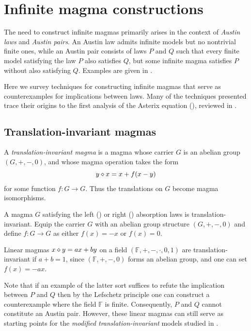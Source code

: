 \chapter{Infinite magma constructions}\label{infinite-magma-constructions-chapter}

The need to construct infinite magmas primarily arises in the context of \emph{Austin laws} and \emph{Austin pairs}.
An Austin law admits infinite models but no nontrivial finite ones, while an Austin pair consists of
laws $P$ and $Q$ such that every finite model satisfying the law $P$ also satisfies $Q$, but some
infinite magma satisfies $P$ without also satisfying $Q$. Examples are given in .

Here we survey techniques for constructing infinite magmas that serve as counterexamples for implications
between laws. Many of the techniques presented trace their origins to the first analysis of the Asterix equation
(), reviewed in .

\section{Translation-invariant magmas}

A \emph{translation-invariant magma} is a magma whose carrier $G$ is an abelian group $(G,+,-,0)$, and whose magma operation takes the form
$$ y \diamond x = x + f(x-y)$$
for some function $f: G \to G$.  Thus the translations on $G$ become magma isomorphisms.

\begin{example}
  A magma $G$ satisfying the left () or right () absorption laws is translation-invariant.
  Equip the carrier $G$ with an abelian group structure $(G,+,-,0)$ and define $f: G \to G$ as either $f(x) = -x$ or $f(x) = 0$.
\end{example}

\begin{example}
  Linear magmas $x\diamond y = ax+by$ on a field $(\mathbb{F},+,-,\cdot,0,1)$ are translation-invariant if $a + b = 1$,
  since $(\mathbb{F},+,-,0)$ forms an abelian group, and one can set $f(x) = -ax$.
\end{example}

Note that if an example of the latter sort suffices to refute the implication between $P$ and $Q$ then
by the Lefschetz principle one can construct a counterexample where the field $\mathbb{F}$ is finite.
Consequently, $P$ and $Q$ cannot constitute an Austin pair. However, these linear magmas can still serve
as starting points for the \emph{modified translation-invariant} models studied in .


